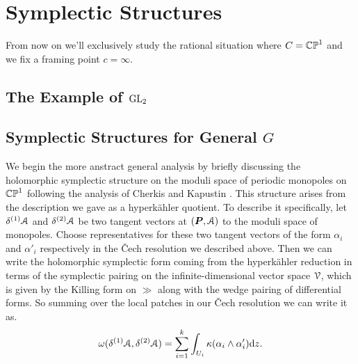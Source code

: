 \documentclass[10pt, oneside]{article}
\renewcommand{\d}{\mathrm{d}}
\begin{document}
\section{Symplectic Structures}
From now on we'll exclusively study the rational situation where $C = \mathbb{CP}^1$ and we fix a framing point $c = \infty$.  

\subsection{The Example of $\mathrm{GL}_2$}


\subsection{Symplectic Structures for General $G$}
We begin the more anstract general analysis by briefly discussing the holomorphic symplectic structure on the moduli space of periodic monopoles on $\mathbb{CP}^1$ following the analysis of Cherkis and Kapustin \cite{CherkisKapustin1, CherkisKapustin3}.  This structure arises from the description we gave as a hyperk\"ahler quotient.  To describe it specifically, let $\delta^{(1)} \mathcal{A}$ and $\delta^{(2)} \mathcal{A}$ be two tangent vectors at $(\boldsymbol{P}, \mathcal{A})$ to the moduli space of monopoles.  Choose representatives for these two tangent vectors of the form $\alpha_i$ and $\alpha'_i$ respectively  in the \v Cech resolution we described above.  Then we can write the holomorphic symplectic form coming from the hyperk\"ahler reduction in terms of the symplectic pairing on the infinite-dimensional vector space $\mathcal{V}$, which is given by the Killing form on $\gg$ along with the wedge pairing of differential forms.  So summing over the local patches in our \v Cech resolution we can write it as.
\[\omega(\delta^{(1)} \mc A, \delta^{(2)} \mc A) = \sum_{i=1}^k \int_{U_i} \kappa(\alpha_i \wedge \alpha'_i) \d z.\]
\end{document}
